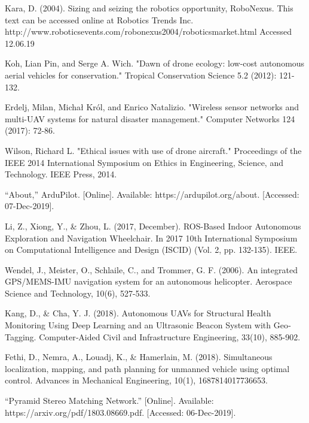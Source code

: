 \documentclass{IEEEtran}
\begin{document}
\begin{thebibliography}{1}

 Kara, D. (2004). Sizing and seizing the robotics opportunity, RoboNexus. This text can be accessed online at Robotics Trends Inc. http://www.roboticsevents.com/robonexus2004/roboticsmarket.html   Accessed 12.06.19

 Koh, Lian Pin, and Serge A. Wich. "Dawn of drone ecology: low-cost autonomous aerial vehicles for conservation." Tropical Conservation Science 5.2 (2012): 121-132.

 Erdelj, Milan, Michał Król, and Enrico Natalizio. "Wireless sensor networks and multi-UAV systems for natural disaster management." Computer Networks 124 (2017): 72-86.

 Wilson, Richard L. "Ethical issues with use of drone aircraft." Proceedings of the IEEE 2014 International Symposium on Ethics in Engineering, Science, and Technology. IEEE Press, 2014.

 “About,” ArduPilot. [Online]. Available: https://ardupilot.org/about. [Accessed: 07-Dec-2019].

Li, Z., Xiong, Y., \& Zhou, L. (2017, December). ROS-Based Indoor Autonomous Exploration and Navigation Wheelchair. In 2017 10th International Symposium on Computational Intelligence and Design (ISCID) (Vol. 2, pp. 132-135). IEEE.

Wendel, J., Meister, O., Schlaile, C., and Trommer, G. F. (2006). An integrated GPS/MEMS-IMU navigation system for an autonomous helicopter. Aerospace Science and Technology, 10(6), 527-533.

Kang, D., \& Cha, Y. J. (2018). Autonomous UAVs for Structural Health Monitoring Using Deep Learning and an Ultrasonic Beacon System with Geo‐Tagging. Computer‐Aided Civil and Infrastructure Engineering, 33(10), 885-902.

 Fethi, D., Nemra, A., Louadj, K., \& Hamerlain, M. (2018). Simultaneous localization, mapping, and path planning for unmanned vehicle using optimal control. Advances in Mechanical Engineering, 10(1), 1687814017736653.

 “Pyramid Stereo Matching Network.” [Online]. Available: https://arxiv.org/pdf/1803.08669.pdf. [Accessed: 06-Dec-2019].


\end{thebibliography}
\end{document}
